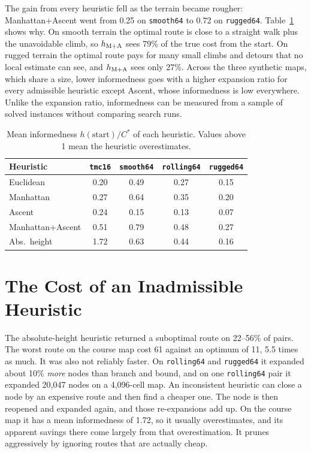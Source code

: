The gain from every heuristic fell as the terrain became rougher: Manhattan+Ascent went from 0.25 on \texttt{smooth64} to 0.72 on \texttt{rugged64}. Table~\ref{tab:informedness} shows why. On smooth terrain the optimal route is close to a straight walk plus the unavoidable climb, so $h_{\mathrm{M+A}}$ sees 79\% of the true cost from the start. On rugged terrain the optimal route pays for many small climbs and detours that no local estimate can see, and $h_{\mathrm{M+A}}$ sees only 27\%. Across the three synthetic maps, which share a size, lower informedness goes with a higher expansion ratio for every admissible heuristic except Ascent, whose informedness is low everywhere. Unlike the expansion ratio, informedness can be measured from a sample of solved instances without comparing search runs.

\begin{table}[ht]
\centering
\caption{Mean informedness $h(\text{start})/C^*$ of each heuristic. Values above 1 mean the heuristic overestimates.}
\label{tab:informedness}
\begin{tabular}{lcccc}
\toprule
Heuristic & \texttt{tmc16} & \texttt{smooth64} & \texttt{rolling64} & \texttt{rugged64} \\
\midrule
Euclidean & 0.20 & 0.49 & 0.27 & 0.15 \\
Manhattan & 0.27 & 0.64 & 0.35 & 0.20 \\
Ascent & 0.24 & 0.15 & 0.13 & 0.07 \\
Manhattan+Ascent & 0.51 & 0.79 & 0.48 & 0.27 \\
Abs.\ height & 1.72 & 0.63 & 0.44 & 0.16 \\
\bottomrule
\end{tabular}
\end{table}


\section{The Cost of an Inadmissible Heuristic}

The absolute-height heuristic returned a suboptimal route on 22--56\% of pairs. The worst route on the course map cost 61 against an optimum of 11, 5.5 times as much. It was also not reliably faster. On \texttt{rolling64} and \texttt{rugged64} it expanded about 10\% \emph{more} nodes than branch and bound, and on one \texttt{rolling64} pair it expanded 20{,}047 nodes on a 4{,}096-cell map. An inconsistent heuristic can close a node by an expensive route and then find a cheaper one. The node is then reopened and expanded again, and those re-expansions add up. On the course map it has a mean informedness of 1.72, so it usually overestimates, and its apparent savings there come largely from that overestimation. It prunes aggressively by ignoring routes that are actually cheap.


